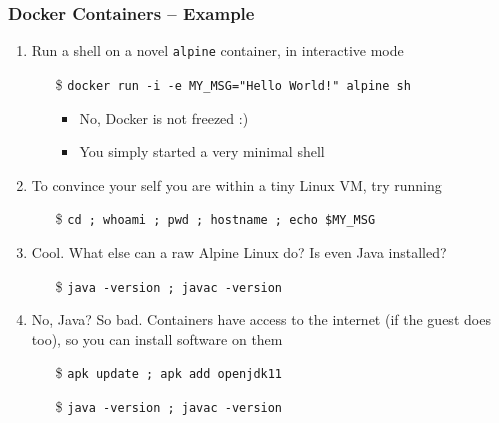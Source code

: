\documentclass{beamer}\mode<presentation>{\usetheme{AMSBolognaFC}}
\begin{document}
\begin{frame}[allowframebreaks]
\frametitle{Docker Containers -- Example}

    \begin{enumerate}
        \item Run a shell on a novel \texttt{alpine} container, in interactive mode
        \begin{itemize}
            \item[\$] \texttt{docker run -i -e MY\_MSG="Hello World!" alpine sh}
            \begin{itemize}
                \item No, Docker is not freezed :)
                \item You simply started a \alert{very minimal} shell
            \end{itemize}
        \end{itemize}

        \vfill

        \item To convince your self you are within a tiny Linux VM, try running
        \begin{itemize}
            \item[\$] \texttt{cd ; whoami ; pwd ; hostname ; echo \$MY\_MSG}
        \end{itemize}

        \vfill

        \item Cool. What else can a raw Alpine Linux do? Is even Java installed?
        \begin{itemize}
            \item[\$] \texttt{java -version ; javac -version}
        \end{itemize}

        \vfill

        \item No, Java? So bad. Containers have access to the internet (if the guest does too), so you can install software on them
        \begin{itemize}
            \item[\$] \texttt{apk update ; apk add openjdk11} 
            \item[\$] \texttt{java -version ; javac -version}
        \end{itemize}


\end{enumerate}
\end{frame}
\end{document}

